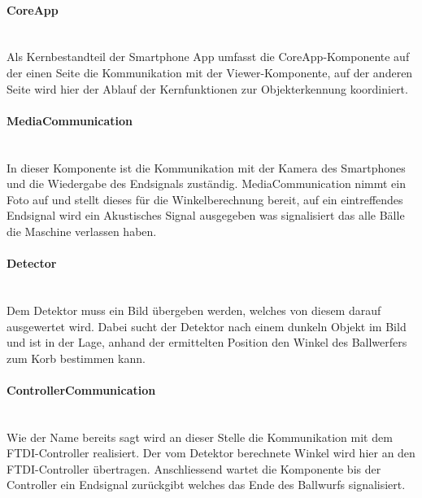 		\paragraph{CoreApp}$~~$\vspace{2mm}\\
		Als Kernbestandteil der Smartphone App umfasst die CoreApp-Komponente auf 
		der einen Seite die Kommunikation mit der Viewer-Komponente, auf der anderen 
		Seite wird hier der Ablauf der Kernfunktionen zur Objekterkennung koordiniert.		
		
		\paragraph{MediaCommunication}$~~$\vspace{2mm}\\
		In dieser Komponente ist die Kommunikation mit der Kamera des Smartphones und 
		die Wiedergabe des Endsignals zuständig. MediaCommunication nimmt ein Foto 
		auf und stellt dieses für die Winkelberechnung bereit, auf ein eintreffendes 
		Endsignal wird ein Akustisches Signal ausgegeben was signalisiert das alle 
		Bälle die Maschine verlassen haben.
		
		\paragraph{Detector}$~~$\vspace{2mm}\\
		Dem Detektor muss ein Bild übergeben werden, welches von diesem darauf 
		ausgewertet wird. Dabei sucht der Detektor nach einem dunkeln Objekt im Bild 
		und ist in der Lage, anhand der ermittelten Position den Winkel des Ballwerfers 
		zum Korb bestimmen kann.
		

		\paragraph{ControllerCommunication}$~~$\vspace{2mm}\\
		Wie der Name bereits sagt wird an dieser Stelle die Kommunikation mit dem 
		FTDI-Controller realisiert. Der vom Detektor berechnete Winkel wird hier an den 
		FTDI-Controller übertragen. Anschliessend wartet die Komponente bis der 
		Controller ein Endsignal zurückgibt welches das Ende des Ballwurfs signalisiert.
		
